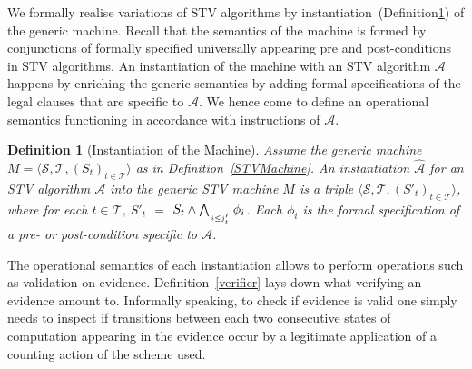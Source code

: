 \documentclass[10pt,conference]{IEEEtran}
\newtheorem{definition}{Definition}
\begin{document}
We formally realise variations of STV algorithms by instantiation~(Definition\ref{STVInst}) of the generic machine. Recall that the semantics of the machine is formed by conjunctions of formally specified universally appearing pre and post-conditions in STV algorithms. An instantiation of the machine with an STV algorithm $\mathcal{A}$ happens by enriching the generic semantics by adding formal specifications of the legal clauses that are specific to $\mathcal{A}$. We hence come to define an operational semantics functioning in accordance with instructions of $\mathcal{A}$. 
\begin{definition}[Instantiation of the Machine]\label{STVInst}
Assume the generic machine $M = \langle \mathcal{S}, \mathcal{T}, (S_t)_{t \in \mathcal{T}} \rangle$ as in Definition~\ref{STVMachine}. An instantiation $\hat{\mathcal{A}}$ for an STV algorithm $\mathcal{A}$ into the generic STV machine $M$ is a triple $\langle \mathcal{S}, \mathcal{T}, (S'_t)_{t \in \mathcal{T}} \rangle$, where for each $t\in\mathcal{T}$, $S'_{t}$ $=$ $S_{t}\wedge\bigwedge_{\atop{i\leq j'_{t}}} \phi_{i}$. Each $\phi_{i}$ is the formal specification of a pre- or post-condition specific to $\mathcal{A}$.   
\end{definition}

The operational semantics of each instantiation allows  to perform operations such as validation on evidence. Definition~\ref{verifier} lays down what verifying an evidence amount to. Informally speaking, to check if  evidence is valid one simply needs to inspect if transitions  between each two consecutive states of computation appearing in the evidence occur by a legitimate application of a counting action of the scheme used.
\end{document}
